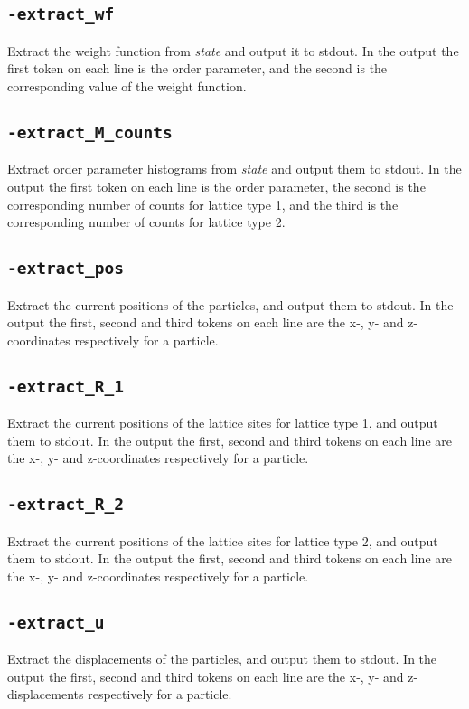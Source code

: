 \documentclass{report}
\begin{document}
\subsection{\texttt{-extract\_wf}}
Extract the weight function from \emph{state} and output it to stdout. In the output the first token on each line is the order parameter, 
and the second is the corresponding value of the weight function.

\subsection{\texttt{-extract\_M\_counts}}
Extract order parameter histograms from \emph{state} and output them to stdout. In the output the first token on each line is the order 
parameter, the second is the corresponding number of counts for lattice type 1, and the third is the corresponding number of counts for 
lattice type 2. 

\subsection{\texttt{-extract\_pos}}
Extract the current positions of the particles, and output them to stdout. In the output the first, second and third tokens on each line 
are the x-, y- and z-coordinates respectively for a particle. 

\subsection{\texttt{-extract\_R\_1}}
Extract the current positions of the lattice sites for lattice type 1, and output them to stdout. In the output the first, second and third 
tokens on each line are the x-, y- and z-coordinates respectively for a particle. 

\subsection{\texttt{-extract\_R\_2}}
Extract the current positions of the lattice sites for lattice type 2, and output them to stdout. In the output the first, second and third 
tokens on each line are the x-, y- and z-coordinates respectively for a particle.

\subsection{\texttt{-extract\_u}}
Extract the displacements of the particles, and output them to stdout. In the output the first, second and third tokens on each line are 
the x-, y- and z-displacements respectively for a particle. 
\end{document}
